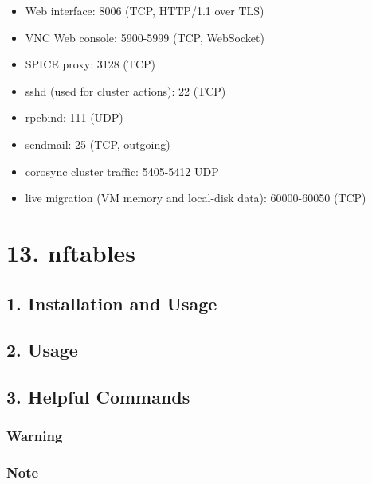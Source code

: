 \begin{itemize}[leftmargin=2cm]

	\item Web interface: 8006 (TCP, HTTP/1.1 over TLS)

	\item VNC Web console: 5900-5999 (TCP, WebSocket)

	\item SPICE proxy: 3128 (TCP)

	\item sshd (used for cluster actions): 22 (TCP)

	\item rpcbind: 111 (UDP)

	\item sendmail: 25 (TCP, outgoing)

	\item corosync cluster traffic: 5405-5412 UDP

	\item live migration (VM memory and local-disk data): 60000-60050 (TCP)

\end{itemize}


\section{13. nftables}

\subsection{1. Installation and Usage}

\subsection{2. Usage}

\subsection{3. Helpful Commands}

\subsubsection{Warning}

\subsubsection{Note}

